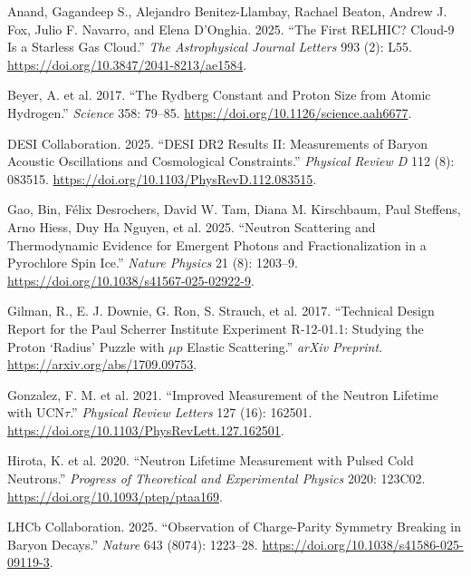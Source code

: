 \documentclass[
  11pt,
  letterpaper,
  twoside,
  openany]{book}
\newlength{\cslhangindent}
\newenvironment{CSLReferences}[2] %
 {\begin{list}{}{%
  \setlength{\itemindent}{0pt}
  \setlength{\leftmargin}{0pt}
  \setlength{\parsep}{0pt}
  \ifodd #1
   \setlength{\leftmargin}{\cslhangindent}
   \setlength{\itemindent}{-1\cslhangindent}
  \fi
  \setlength{\itemsep}{#2\baselineskip}}}
 {\end{list}}
\begin{document}
\label{refs}
\begin{CSLReferences}{1}{0}
Anand, Gagandeep S., Alejandro Benitez-Llambay, Rachael Beaton, Andrew
J. Fox, Julio F. Navarro, and Elena D'Onghia. 2025. {``The First
{RELHIC}? {Cloud-9} Is a Starless Gas Cloud.''} \emph{The Astrophysical
Journal Letters} 993 (2): L55.
\url{https://doi.org/10.3847/2041-8213/ae1584}.

Beyer, A. et al. 2017. {``The {R}ydberg Constant and Proton Size from
Atomic Hydrogen.''} \emph{Science} 358: 79--85.
\url{https://doi.org/10.1126/science.aah6677}.

DESI Collaboration. 2025. {``{DESI} {DR2} Results {II}: Measurements of
Baryon Acoustic Oscillations and Cosmological Constraints.''}
\emph{Physical Review D} 112 (8): 083515.
\url{https://doi.org/10.1103/PhysRevD.112.083515}.

Gao, Bin, Félix Desrochers, David W. Tam, Diana M. Kirschbaum, Paul
Steffens, Arno Hiess, Duy Ha Nguyen, et al. 2025. {``Neutron Scattering
and Thermodynamic Evidence for Emergent Photons and Fractionalization in
a Pyrochlore Spin Ice.''} \emph{Nature Physics} 21 (8): 1203--9.
\url{https://doi.org/10.1038/s41567-025-02922-9}.

Gilman, R., E. J. Downie, G. Ron, S. Strauch, et al. 2017. {``Technical
Design Report for the {Paul Scherrer Institute} Experiment {R-12-01.1}:
Studying the Proton {`Radius'} Puzzle with \(\mu p\) Elastic
Scattering.''} \emph{arXiv Preprint}.
\url{https://arxiv.org/abs/1709.09753}.

Gonzalez, F. M. et al. 2021. {``Improved Measurement of the Neutron
Lifetime with {UCN\(\tau\)}.''} \emph{Physical Review Letters} 127 (16):
162501. \url{https://doi.org/10.1103/PhysRevLett.127.162501}.

Hirota, K. et al. 2020. {``Neutron Lifetime Measurement with Pulsed Cold
Neutrons.''} \emph{Progress of Theoretical and Experimental Physics}
2020: 123C02. \url{https://doi.org/10.1093/ptep/ptaa169}.

LHCb Collaboration. 2025. {``Observation of Charge-Parity Symmetry
Breaking in Baryon Decays.''} \emph{Nature} 643 (8074): 1223--28.
\url{https://doi.org/10.1038/s41586-025-09119-3}.


\end{CSLReferences}
\end{document}
